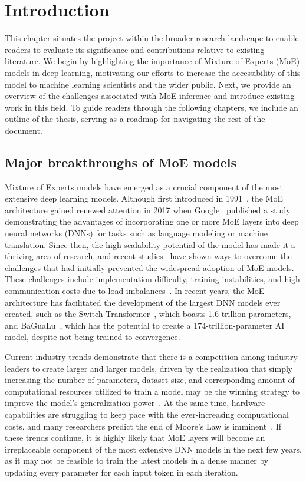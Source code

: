 
\chapter{Introduction}
This chapter situates the project within the broader research landscape to enable readers to evaluate its significance and contributions relative to existing literature. We begin by highlighting the importance of Mixture of Experts (MoE) models in deep learning, motivating our efforts to increase the accessibility of this model to machine learning scientists and the wider public. Next, we provide an overview of the challenges associated with MoE inference and introduce existing work in this field. To guide readers through the following chapters, we include an outline of the thesis, serving as a roadmap for navigating the rest of the document.

\section{Major breakthroughs of MoE models}\label{intro1}
Mixture of Experts models have emerged as a crucial component of the most extensive deep learning models. Although first introduced in 1991~\cite{original_moe}, the MoE architecture gained renewed attention in 2017 when Google~\cite{shazeer2017} published a study demonstrating the advantages of incorporating one or more MoE layers into deep neural networks (DNNs) for tasks such as language modeling or machine translation. Since then, the high scalability potential of the model has made it a thriving area of research, and recent studies~\cite{g-shard,tutel,fastermoe,switch_transformer} have shown ways to overcome the challenges that had initially prevented the widespread adoption of MoE models. These challenges include implementation difficulty, training instabilities, and high communication costs due to load imbalances~\cite{switch_transformer}. In recent years, the MoE architecture has facilitated the development of the largest DNN models ever created, such as the Switch Transformer~\cite{switch_transformer}, which boasts 1.6 trillion parameters, and BaGuaLu~\cite{BaGuaLu}, which has the potential to create a 174-trillion-parameter AI model, despite not being trained to convergence.

Current industry trends demonstrate that there is a competition among industry leaders to create larger and larger models, driven by the realization that simply increasing the number of parameters, dataset size, and corresponding amount of computational resources utilized to train a model may be the winning strategy to improve the model's generalization power~\cite{sutton_2019}. At the same time, hardware capabilities are struggling to keep pace with the ever-increasing computational costs, and many researchers predict the end of Moore's Law is imminent~\cite{rotman_2021}. If these trends continue, it is highly likely that MoE layers will become an irreplaceable component of the most extensive DNN models in the next few years, as it may not be feasible to train the latest models in a dense manner by updating every parameter for each input token in each iteration.


